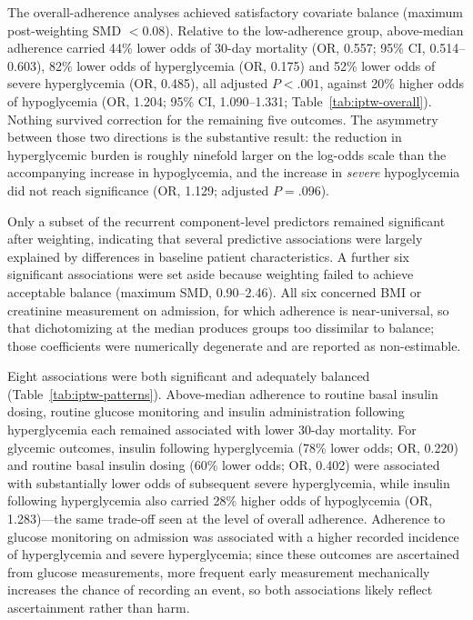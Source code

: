 The overall-adherence analyses achieved satisfactory covariate balance (maximum
post-weighting SMD $<$0.08). Relative to the low-adherence group, above-median
adherence carried 44\% lower odds of 30-day mortality (OR, 0.557; 95\% CI,
0.514--0.603), 82\% lower odds of hyperglycemia (OR, 0.175) and 52\% lower odds
of severe hyperglycemia (OR, 0.485), all adjusted $P<.001$, against 20\% higher
odds of hypoglycemia (OR, 1.204; 95\% CI, 1.090--1.331;
Table~\ref{tab:iptw-overall}). Nothing survived correction for the remaining
five outcomes. The asymmetry between those two directions is the substantive
result: the reduction in hyperglycemic burden is roughly ninefold larger on the
log-odds scale than the accompanying increase in hypoglycemia, and the increase
in \emph{severe} hypoglycemia did not reach significance (OR, 1.129; adjusted
$P=.096$).

Only a subset of the recurrent component-level predictors remained significant
after weighting, indicating that several predictive associations were largely
explained by differences in baseline patient characteristics. A further six
significant associations were set aside because weighting failed to achieve
acceptable balance (maximum SMD, 0.90--2.46). All six concerned BMI or
creatinine measurement on admission, for which adherence is near-universal, so
that dichotomizing at the median produces groups too dissimilar to balance;
those coefficients were numerically degenerate and are reported as
non-estimable.

Eight associations were both significant and adequately balanced
(Table~\ref{tab:iptw-patterns}). Above-median adherence to routine basal
insulin dosing, routine glucose monitoring and insulin administration following
hyperglycemia each remained associated with lower 30-day mortality. For
glycemic outcomes, insulin following hyperglycemia (78\% lower odds; OR, 0.220)
and routine basal insulin dosing (60\% lower odds; OR, 0.402) were associated
with substantially lower odds of subsequent severe hyperglycemia, while insulin
following hyperglycemia also carried 28\% higher odds of hypoglycemia (OR,
1.283)---the same trade-off seen at the level of overall adherence. Adherence to glucose monitoring on
admission was associated with a higher recorded incidence of hyperglycemia and
severe hyperglycemia; since these outcomes are ascertained from glucose
measurements, more frequent early measurement mechanically increases the chance
of recording an event, so both associations likely reflect ascertainment rather
than harm.

